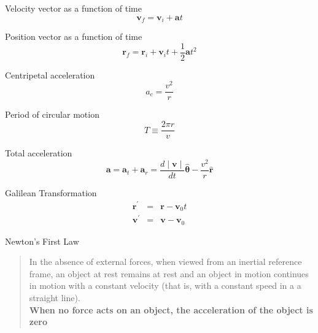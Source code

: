 \documentclass[avery5371]{flashcards}
\begin{document}

\begin{flashcard}[Chapter 4]{Velocity vector as a function of time}
\bigskip
\bigskip
\begin{displaymath}
\mathbf{v}_{f} = \mathbf{v}_{i} + \mathbf{a} t
\end{displaymath}
\end{flashcard}

\begin{flashcard}[Chapter 4]{Position vector as a function of time}
\bigskip
\bigskip
\begin{displaymath}
\mathbf{r}_{f} = \mathbf{r}_{i} + \mathbf{v}_{i}t + \frac{1}{2} \mathbf{a}t^{2}
\end{displaymath}
\end{flashcard}

\begin{flashcard}[Chapter 4]{Centripetal acceleration}
\bigskip
\bigskip
\begin{displaymath}
a_{c} = \frac{v^{2}}{r}
\end{displaymath}
\end{flashcard}

\begin{flashcard}[Chapter 4]{Period of circular motion}
\bigskip
\bigskip
\begin{displaymath}
T \equiv \frac{2 \pi r}{v}
\end{displaymath}
\end{flashcard}

\begin{flashcard}[Chapter 4]{Total acceleration}
\bigskip
\bigskip
\begin{displaymath}
\mathbf{a} = \mathbf{a}_{t} + \mathbf{a}_{r} = \frac{d \mid \mathbf{v} \mid}{dt} \hat{\mathbf{\theta}} - \frac{v^{2}}{r} \hat{\mathbf{r}}
\end{displaymath}
\end{flashcard}

\begin{flashcard}[Chapter 4]{Galilean Transformation}
\bigskip
\bigskip
\begin{eqnarray}
\mathbf{r}^{\prime} &=& \mathbf{r} - \mathbf{v}_{0}t \nonumber\\
\mathbf{v}^{\prime} &=& \mathbf{v} - \mathbf{v}_{0} \nonumber
\end{eqnarray}
\end{flashcard}


\begin{flashcard}[Chapter 5]{Newton's First Law}
\smallskip
\begin{quote}
In the absence of external forces, when viewed from an inertial reference frame, an object at rest remains at rest and an object in motion continues in motion with a constant velocity (that is, with a constant speed in a a straight line).
\\
\smallskip
\textbf{When no force acts on an object, the acceleration of the object is zero}
\end{quote}
\hfill
\end{flashcard}
\end{document}
